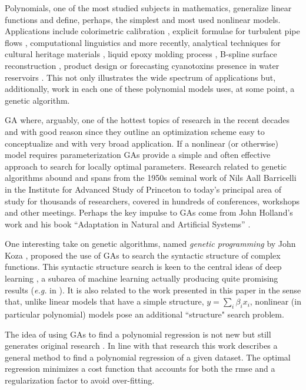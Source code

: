 \documentclass[draft,authoryear,3p,times,twocolumn]{elsarticle}
\begin{document}
Polynomials, one of the most studied subjects in mathematics, generalize li\-ne\-ar functions and define, perhaps, the simplest and most used nonlinear models. Applications include colorimetric calibration \citep{mendes2005adaptive}, explicit formulae for turbulent pipe flows \citep{davidson1999method}, computational linguistics \citep{sanchez2009obtaining} and more recently, analytical techniques for cultural heritage materials \citep{csefalvayova2010use}, liquid epoxy molding process \citep{chan2011modeling}, B-spline surface reconstruction \citep{galvez2012iterative}, product design \citep{chan2012development} or forecasting cyanotoxins presence in water reservoirs \citep{garcia2013hybrid}. This not only illustrates the wide spectrum of applications but, additionally, work in each one of these polynomial models uses, at some point, a genetic algorithm.

\ac{GA} where, arguably, one of the hottest topics of research in the recent decades and with good reason since they outline an optimization scheme easy to conceptualize and with very broad application. If a nonlinear (or otherwise) model requires parameterization \acp{GA} provide a simple and often effective approach to search for locally optimal parameters. Research related to genetic algorithms abound and spans from the 1950s seminal work of Nils Aall Barricelli \citep{barricelli1962numerical} in the Institute for Advanced Study of Princeton to today's principal area of study for thousands of researchers, covered in hundreds of conferences, workshops and other meetings. Perhaps the key impulse to \acp{GA} come from John Holland's work and his book ``Adaptation in Natural and Artificial Systems'' \citep{holland1975adaptation}.  

One interesting take on genetic algorithms, named \emph{genetic programming} by John Koza \citep{koza1992genetic}, proposed the use of \acp{GA} to search the syntactic structure of complex functions. This syntactic structure search is keen to the central ideas of deep learning \citep{bengio2013representation, bengio2009learning}, a subarea of machine learning actually producing quite promising results (\emph{e.g.} in \cite{Tarlow:2013fk}). It is also related to the work presented in this paper in the sense that, unlike linear models that have a simple structure, $y=\sum_i \beta_i x_i$, nonlinear (in particular polynomial) models pose an additional ``structure" search problem.

The idea of using \acp{GA} to find a polynomial regression is not new \citep{maertens2006genetic, yu2008optimal, wu2009novel} but still generates original research \citep{hofwing2011optimal, cetisli2011polynomial}. In line with that research this work describes a general method to find a polynomial regression of a given dataset. The optimal regression minimizes a cost function that accounts for both the \ac{rmse} and a regularization factor to avoid over-fitting. 
\end{document}
